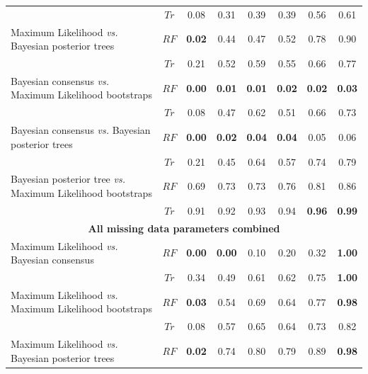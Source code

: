 \begin{landscape}
\begin{table}[!htb]
\begin{tabular}{lccccccc}
                                                                       & $Tr$ & 0.08 & 0.31 & 0.39 & 0.39 & 0.56 & 0.61 \\ 
    Maximum Likelihood \textit{vs.} Bayesian posterior trees           & $RF$ & \textbf{0.02} & 0.44 & 0.47 & 0.52 & 0.78 & 0.90 \\ 
                                                                       & $Tr$ & 0.21 & 0.52 & 0.59 & 0.55 & 0.66 & 0.77 \\ 
    Bayesian consensus \textit{vs.} Maximum Likelihood bootstraps      & $RF$ & \textbf{0.00} & \textbf{0.01} & \textbf{0.01} & \textbf{0.02} & \textbf{0.02} & \textbf{0.03} \\ 
                                                                       & $Tr$ & 0.08 & 0.47 & 0.62 & 0.51 & 0.66 & 0.73 \\ 
    Bayesian consensus \textit{vs.} Bayesian posterior trees           & $RF$ & \textbf{0.00} & \textbf{0.02} & \textbf{0.04} & \textbf{0.04} & 0.05 & 0.06 \\ 
                                                                       & $Tr$ & 0.21 & 0.45 & 0.64 & 0.57 & 0.74 & 0.79 \\ 
    Bayesian posterior tree \textit{vs.} Maximum Likelihood bootstraps & $RF$ & 0.69 & 0.73 & 0.73 & 0.76 & 0.81 & 0.86 \\ 
                                                                       & $Tr$ & 0.91 & 0.92 & 0.93 & 0.94 & \textbf{0.96} & \textbf{0.99} \\
  \hline
  \multicolumn{8}{c}{\textbf{All missing data parameters combined}}\\
  \hline
    Maximum Likelihood \textit{vs.} Bayesian consensus                 & $RF$ & \textbf{0.00} & \textbf{0.00} & 0.10 & 0.20 & 0.32 & \textbf{1.00} \\ 
                                                                       & $Tr$ & 0.34 & 0.49 & 0.61 & 0.62 & 0.75 & \textbf{1.00} \\ 
    Maximum Likelihood \textit{vs.} Maximum Likelihood bootstraps      & $RF$ & \textbf{0.03} & 0.54 & 0.69 & 0.64 & 0.77 & \textbf{0.98} \\ 
                                                                       & $Tr$ & 0.08 & 0.57 & 0.65 & 0.64 & 0.73 & 0.82 \\ 
    Maximum Likelihood \textit{vs.} Bayesian posterior trees           & $RF$ & \textbf{0.02} & 0.74 & 0.80 & 0.79 & 0.89 & \textbf{0.98} \\ 

\end{tabular}
\end{table}
\end{landscape}
